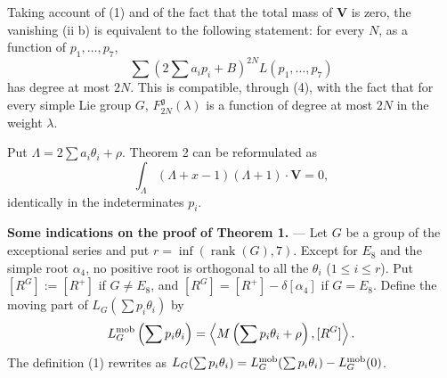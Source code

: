 \documentclass[11pt,a4paper]{article}
\theoremstyle{plain}
\theoremstyle{definition}
\DeclareMathOperator{\rank}{rank}
\begin{document}
Taking account of (1) and of the fact that the total mass of $\mathbf V$ is zero, the vanishing (ii b) is equivalent to the following statement: for every $N$, as a function of $p_1,\ldots,p_7$,
\[
\sum \left(2\sum a_i p_i+B\right)^{2N}L(p_1,\ldots,p_7)
\]
has degree at most $2N$. This is compatible, through (4), with the fact that for every simple Lie group $G$, $F_{2N}^{\mathfrak g}(\lambda)$ is a function of degree at most $2N$ in the weight $\lambda$.

Put $\Lambda=2\sum a_i\theta_i+\rho$. Theorem 2 can be reformulated as
\begin{equation}\label{eq:12}
\int_\Lambda (\Lambda+x-1)(\Lambda+1)\cdot\mathbf V=0,
\end{equation}
identically in the indeterminates $p_i$.

\bigskip

\textbf{Some indications on the proof of Theorem 1.} --- Let $G$ be a group of the exceptional series and put $r=\inf(\rank(G),7)$. Except for $E_8$ and the simple root $\alpha_4$, no positive root is orthogonal to all the $\theta_i$ ($1\leq i\leq r$). Put $[R^G]:=[R^+]$ if $G\neq E_8$, and $[R^G]=[R^+]-\delta[\alpha_4]$ if $G=E_8$. Define the moving part of $L_G(\sum p_i\theta_i)$ by
\begin{equation}\label{eq:13}
L_G^{\textup{mob}}\left(\sum p_i\theta_i\right)=\left\langle M\left(\sum p_i\theta_i+\rho\right),[R^G]\right\rangle.
\end{equation}
The definition (1) rewrites as $L_G(\sum p_i\theta_i)=L_G^{\textup{mob}}(\sum p_i\theta_i)-L_G^{\textup{mob}}(0)$.
\end{document}
